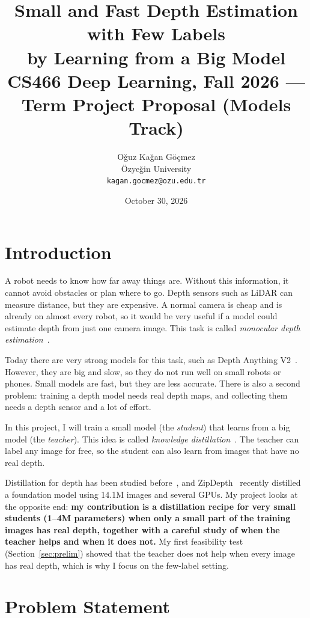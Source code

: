 \documentclass[11pt]{article}
\title{\textbf{Small and Fast Depth Estimation with Few Labels\\by Learning from a Big Model}\\[4pt]
\large CS466 Deep Learning, Fall 2026 --- Term Project Proposal (Models Track)}
\author{Oğuz Kağan Göçmez\\
\small Özyeğin University\\
\small \texttt{kagan.gocmez@ozu.edu.tr}}
\date{October 30, 2026}
\begin{document}
\maketitle

\section{Introduction}

A robot needs to know how far away things are. Without this information,
it cannot avoid obstacles or plan where to go. Depth sensors such as LiDAR
can measure distance, but they are expensive. A normal camera is cheap and is
already on almost every robot, so it would be very useful if a model could
estimate depth from just one camera image. This task is called
\emph{monocular depth estimation}~\cite{eigen2014}.

Today there are very strong models for this task, such as Depth Anything
V2~\cite{yang2024dav2}. However, they are big and slow, so they do not run
well on small robots or phones. Small models are fast, but they are less
accurate. There is also a second problem: training a depth model needs real
depth maps, and collecting them needs a depth sensor and a lot of effort.

In this project, I will train a small model (the \emph{student}) that learns
from a big model (the \emph{teacher}). This idea is called \emph{knowledge
distillation}~\cite{hinton2015}. The teacher can label any image for free, so
the student can also learn from images that have no real depth.

Distillation for depth has been studied before~\cite{wang2021kd}, and
ZipDepth~\cite{tosi2026zipdepth} recently distilled a foundation model using
14.1M images and several GPUs. My project looks at the opposite end:
\textbf{my contribution is a distillation recipe for very small students
(1--4M parameters) when only a small part of the training images has real
depth, together with a careful study of when the teacher helps and when it
does not.} My first feasibility test (Section~\ref{sec:prelim}) showed that
the teacher does not help when every image has real depth, which is why I
focus on the few-label setting.

\section{Problem Statement}
\end{document}
